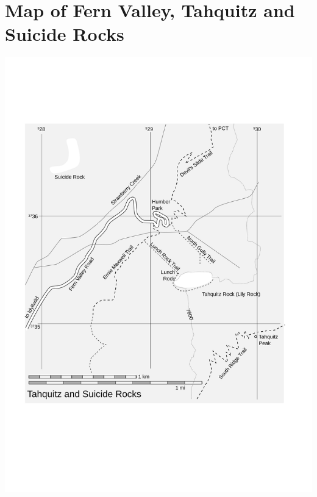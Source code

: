 \documentclass{tahquitz}
\begin{document}
\tableofcontents

\vfill\pagebreak


\discussionparindent

\section{Map of Fern Valley, Tahquitz and Suicide Rocks}

\vspace{10mm}

\includegraphics[width=\linewidth]{figs/large_area_map}

\vfill

\pagebreak

\end{document}
